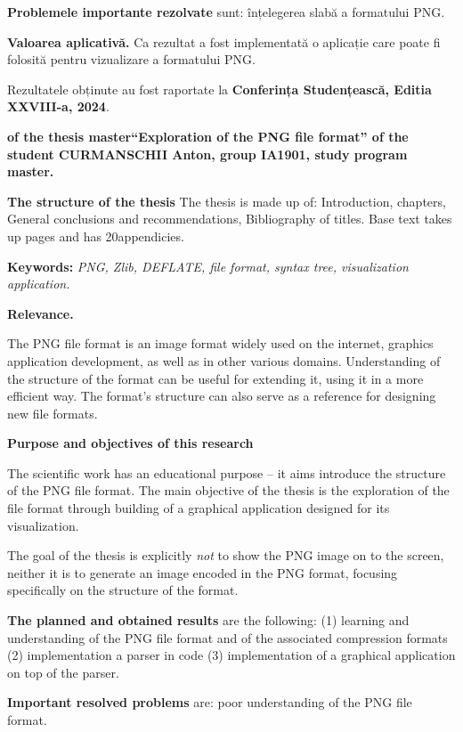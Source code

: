 \documentclass[a4paper,12pt]{report}
\newcommand{\authorName}{CURMANSCHII Anton}
\newcommand{\thesisTitleEng}{Exploration of the PNG file format}
\newcommand{\uniGroupName}{IA1901}
\newcommand{\thesisType}{master}
\newcommand{\programulDeStudii}{master}
\newcommand{\anexeCount}{20}
\newcommand{\conferencesList}{Conferința Studențească, Editia XXVIII-a, 2024}
\begin{document}
\textbf{Problemele importante rezolvate} sunt: înțelegerea slabă a formatului \ac{PNG}.

\textbf{Valoarea aplicativă.} Ca rezultat a fost implementată o aplicație care poate fi folosită pentru vizualizare a formatului \ac{PNG}.

Rezultatele obținute au fost raportate la \textbf{\conferencesList}.

\clearpage
{}

\textbf{of the thesis \thesisType ``\thesisTitleEng'' of the student \authorName{}, group \uniGroupName, study program \programulDeStudii.}

\textbf{The structure of the thesis}
The thesis is made up of: Introduction,  chapters,
General conclusions and recommendations, Bibliography of \bibliographyEntryCount{} titles.
Base text takes up \usefulPageCount{} pages and has \anexeCount appendicies.

\textbf{Keywords:}
\textit{\ac{PNG}, \ac{Zlib}, \ac{DEFLATE}, file format, syntax tree, visualization application.}

\textbf{Relevance.}

The \ac{PNG} file format is an image format widely used on the internet,
graphics application development, as well as in other various domains.
Understanding of the structure of the format can be useful for extending it,
using it in a more efficient way.
The format's structure can also serve as a reference for designing new file formats.

\textbf{Purpose and objectives of this research}

The scientific work has an educational purpose
-- it aims introduce the structure of the \ac{PNG} file format.
The main objective of the thesis is the exploration of the file format
through building of a graphical application designed for its visualization.

The goal of the thesis is explicitly \textit{not} to show the \ac{PNG} image on to the screen,
neither it is to generate an image encoded in the \ac{PNG} format, focusing specifically
on the structure of the format.

\textbf{The planned and obtained results} are the following:
(1) learning and understanding of the \ac{PNG} file format and of the associated compression formats
(2) implementation a parser in code
(3) implementation of a graphical application on top of the parser.

\textbf{Important resolved problems} are: poor understanding of the \ac{PNG} file format.
\end{document}
